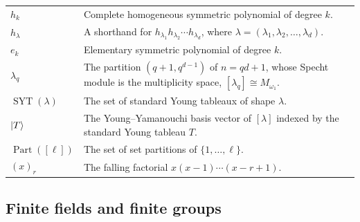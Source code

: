 \documentclass[11pt,letterpaper]{article}
\theoremstyle{plain}
\theoremstyle{plain}
\theoremstyle{plain}
\theoremstyle{plain}
\theoremstyle{plain}
\theoremstyle{plain}
\theoremstyle{plain}
\theoremstyle{definition}
\theoremstyle{plain}
\begin{document}
\begin{tabular}{@{}ll@{}}
\parbox[t]{0.22\textwidth}{$h_{k}$} & \parbox[t]{0.72\textwidth}{Complete homogeneous symmetric polynomial of degree $k$.} \\[0.6em]

\parbox[t]{0.22\textwidth}{$h_{\lambda}$} & \parbox[t]{0.72\textwidth}{A shorthand for $h_{\lambda_1} h_{\lambda_2} \cdots h_{\lambda_d}$, where $\lambda=(\lambda_1,\lambda_2,\ldots,\lambda_d)$.} \\[0.6em]

\parbox[t]{0.22\textwidth}{$e_k$} & \parbox[t]{0.72\textwidth}{Elementary symmetric polynomial of degree $k$.} \\[0.6em]

\parbox[t]{0.22\textwidth}{$\lambda_q$} & \parbox[t]{0.72\textwidth}{The partition $(q+1,q^{d-1})$ of $n=qd+1$, whose Specht module is the multiplicity space, $[\lambda_q]\cong M_{\omega_1}$.} \\[0.6em]

\parbox[t]{0.22\textwidth}{$\operatorname{SYT}(\lambda)$} & \parbox[t]{0.72\textwidth}{The set of standard Young tableaux of shape $\lambda$.} \\[0.6em]

\parbox[t]{0.22\textwidth}{$\ket T$} & \parbox[t]{0.72\textwidth}{The Young--Yamanouchi basis vector of $[\lambda]$ indexed by the standard Young tableau $T$.} \\[0.6em]

\parbox[t]{0.22\textwidth}{$\operatorname{Part}([\ell])$} & \parbox[t]{0.72\textwidth}{The set of set partitions of $\{1,\ldots,\ell\}$.} \\[0.6em]

\parbox[t]{0.22\textwidth}{$(x)_r$} & \parbox[t]{0.72\textwidth}{The falling factorial $x(x-1)\cdots(x-r+1)$.} \\[0.6em]

\end{tabular}


\subsection*{Finite fields and finite groups}
\end{document}
